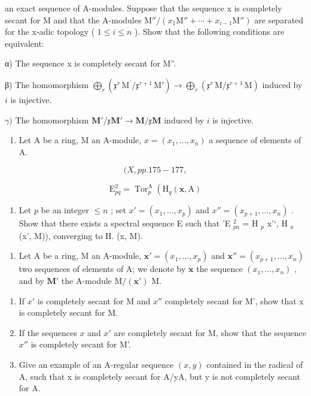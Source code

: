 an exact sequence of A-modules. Suppose that the sequence x is completely secant for M and that the A-modules \(\mathrm{M}''/(x_{1}\mathrm{M}''+\cdots+x_{i-1}\mathrm{M}'')\) are separated for the x-adic topology ( \(1\leqslant i\leqslant n\) ). Show that the following conditions are equivalent:

α) The sequence x is completely secant for M''.

β) The homomorphism \(\bigoplus_{r} (\mathfrak{x}^{r} \, \mathrm{M}^{\prime}/\mathfrak{x}^{r+1} \, \mathrm{M}') \to \bigoplus_{r} (\mathfrak{x}^{r} \, \mathrm{M}/\mathfrak{x}^{r+1} \, \mathrm{M})\) induced by \(i\) is injective.

\(\gamma)\) The homomorphism \(\mathbf{M}' / \mathfrak{x}\mathbf{M}' \to \mathbf{M} / \mathfrak{x}\mathbf{M}\) induced by \(i\) is injective.

\begin{enumerate}
\def\labelenumi{\arabic{enumi})}
\setcounter{enumi}{6}
\tightlist
\item
  Let A be a ring, M an A-module, \(x = (x_1, \ldots, x_n)\) a sequence of elements of A.
\end{enumerate}

\[
(X, p p. 1 7 5 - 1 7 7,
\]

\[
\mathrm{E} _ {p q} ^ {2} = \operatorname{Tor} _ {p} ^ {\mathrm{A}} \left(\mathrm{H} _ {q} (\boldsymbol {x}, \mathrm{A}) \right.
\]

\begin{enumerate}
\def\labelenumi{\alph{enumi})}
\setcounter{enumi}{1}
\tightlist
\item
  Let \(p\) be an integer \(\leqslant n\) ; set \(x' = (x_1, \ldots, x_p)\) and \(x'' = (x_{p+1}, \ldots, x_n)\) . Show that there exists a spectral sequence E such that 'E \(_{pa}^{2}\) = H \(_{p}\) x'`, H \(_{a}\) (x', M)), converging to H. (x, M).
\end{enumerate}

\begin{enumerate}
\def\labelenumi{\arabic{enumi})}
\setcounter{enumi}{7}
\tightlist
\item
  Let A be a ring, M an A-module, \(\boldsymbol{x}' = (x_1, \ldots, x_p)\) and \(\boldsymbol{x}'' = (x_{p+1}, \ldots, x_n)\) two sequences of elements of A; we denote by \(\boldsymbol{x}\) the sequence \((x_1, \ldots, x_n)\) , and by \(\boldsymbol{M}'\) the A-module \(\mathrm{M}/(\boldsymbol{x}')\) M.
\end{enumerate}

\begin{enumerate}
\def\labelenumi{\alph{enumi})}
\item
  If \(x'\) is completely secant for M and \(x''\) completely secant for M', show that x is completely secant for M.
\item
  If the sequences \(x\) and \(x'\) are completely secant for M, show that the sequence \(x''\) is completely secant for M'.
\item
  Give an example of an A-regular sequence \((x, y)\) contained in the radical of A, such that x is completely secant for A/yA, but y is not completely secant for A.
\end{enumerate}


